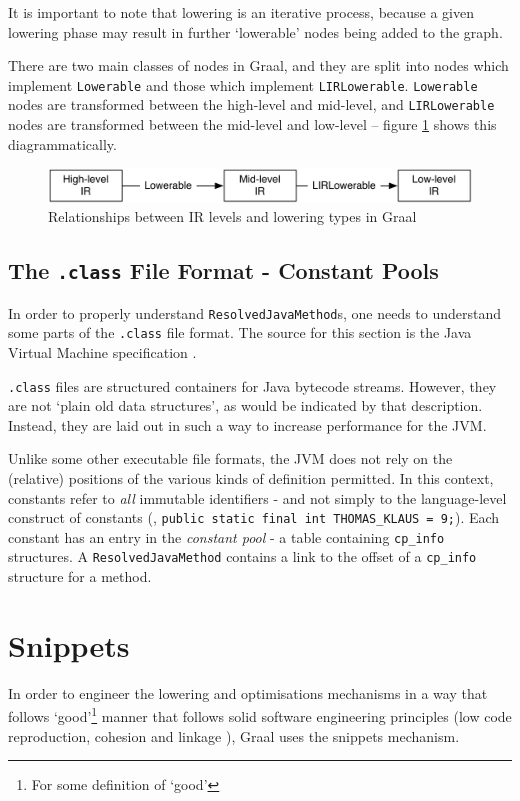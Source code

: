 It is important to note that lowering is an iterative process, because a given lowering phase may result in further `lowerable' nodes being added to the graph.

There are two main classes of nodes in Graal, and they are split into nodes which implement \texttt{Lowerable} and those which implement \texttt{LIRLowerable}. \texttt{Lowerable} nodes are transformed between the high-level and mid-level, and \texttt{LIRLowerable} nodes are transformed between the mid-level and low-level -- figure \ref{fig:lowering-stages} shows this diagrammatically.

\begin{figure}
	\centering
	\includegraphics[width=1.0\textwidth]{graphics/lowering-stages.pdf}
	\caption{Relationships between IR levels and lowering types in Graal}
	\label{fig:lowering-stages}
\end{figure}

	\subsection{The \texttt{.class} File Format - Constant Pools} \label{sec:graal/classformat}
	In order to properly understand \texttt{ResolvedJavaMethod}s, one needs to understand some parts of the \texttt{.class} file format. The source for this section is the Java Virtual Machine specification \citep[p.~69]{JVMSpec}.
		
	\texttt{.class} files are structured containers for Java bytecode streams. However, they are not `plain old data structures', as would be indicated by that description. Instead, they are laid out in such a way to increase performance for the JVM.
				
	Unlike some other executable file formats, the JVM does not rely on the (relative) positions of the various kinds of definition permitted. In this context, constants refer to \emph{all} immutable identifiers - and not simply to the language-level construct of constants (\eg, \texttt{public static final int THOMAS\_KLAUS = 9;}). Each constant has an entry in the \emph{constant pool} - a table containing \texttt{cp\_info} structures. A \texttt{ResolvedJavaMethod} contains a link to the offset of a \texttt{cp\_info} structure for a method.
		
\section{Snippets} \label{sec:graal/snippets}
In order to engineer the lowering and optimisations mechanisms in a way that follows `good'\footnote{For some definition of `good'} manner that follows solid software engineering principles (low code reproduction, cohesion and linkage \etc), Graal uses the snippets mechanism.

